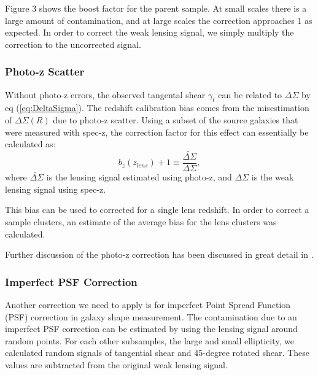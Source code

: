 \documentclass[iop]{emulateapj}
\begin{document}
Figure 3 shows the boost factor for the parent sample. At small scales there is a large amount of contamination, and at large scales the correction approaches 1 as expected. In order to correct the weak lensing signal, we simply multiply the correction to the uncorrected signal.


\subsubsection{Photo-z Scatter}
Without photo-z errors, the observed tangental shear $\gamma_t$ can be related to $\Delta \Sigma$ by eq (\ref{eq:DeltaSigma}).  The redshift calibration bias comes from the misestimation of $\Delta\Sigma(R)$ due to photo-z scatter.
Using a subset of the source galaxies that were measured with spec-z, the correction factor for this effect can essentially be calculated as:
	\begin{equation}\label{eq:PhotoZ}
		b_z (z_{lens}) + 1 \equiv \frac{\widetilde{\Delta\Sigma}} {\Delta\Sigma},
	\end{equation}
where $\widetilde{\Delta\Sigma}$ is the lensing signal estimated using photo-z, and $\Delta\Sigma$ is the weak lensing signal using spec-z.

This bias can be used to corrected for a single lens redshift. In order to correct a sample clusters, an estimate of the average bias for the lens clusters was calculated.  

Further discussion of the photo-z correction has been discussed in great detail in \cite{2012MNRAS.420.3240N}.	

\subsubsection{Imperfect PSF Correction}
Another correction we need to apply is for imperfect Point Spread Function (PSF) correction in galaxy shape measurement. The contamination due to an imperfect PSF correction can be estimated by using the lensing signal around random points.
For each other subsamples, the large and small ellipticity, we calculated random signals of tangential shear and 45-degree rotated shear. These values are subtracted from the original weak lensing signal. 
\end{document}
